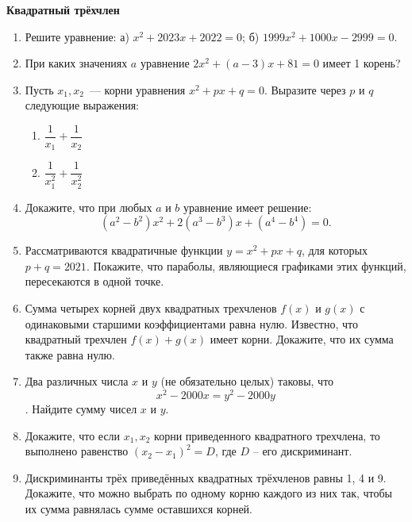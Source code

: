 \documentclass{article}
\begin{document}
\large
	

\begin{center}
\textbf{Квадратный трёхчлен}
\end{center}

\begin{enumerate}[label*=\protect\fbox{\arabic{enumi}}]

\item Решите уравнение: а) $x^2 + 2023x + 2022 = 0$; б) $1999x^2 + 1000x-2999=0$.

\item При каких значениях $a$ уравнение $2x^2 + (a - 3)x + 81 = 0$ имеет 1 корень?

\item Пусть $x_1, x_2$~--- корни уравнения  $x^2 + px + q = 0$.  Выразите через $p$ и $q$ следующие выражения: 
\begin{enumerate}
	
	\item $\dfrac{1}{x_1} + \dfrac{1}{x_2}$
	
	\item $\dfrac{1}{x_1^2} + \dfrac{1}{x_2^2}$
	
\end{enumerate}

\item Докажите, что при любых $a$ и $b$ уравнение имеет решение:
$$(a^2 - b^2)x^2 + 2(a^3 - b^3)x + (a^4 -b^4) =0.$$

\item Рассматриваются квадратичные функции  $y = x^2 + px + q$,  для которых  $p + q = 2021$.
Покажите, что параболы, являющиеся графиками этих функций, пересекаются в одной точке.

\item Сумма четырех корней двух квадратных трехчленов $f(x)$ и $g(x)$ с одинаковыми старшими коэффициентами равна нулю. Известно, что квадратный трехчлен $f(x)+g(x)$ имеет корни. Докажите, что их сумма также равна нулю.

\item Два различных числа $x$ и $y$ (не обязательно целых) таковы, что $$x^2 - 2000x = y^2 - 2000y$$.  Найдите сумму чисел $x$ и $y$.

\item Докажите, что если $x_1 , x_2$ корни приведенного квадратного трехчлена, то выполнено равенство $(x_2 - x_1)^2 = D$, где $D$ – его дискриминант.

\item Дискриминанты трёх приведённых квадратных трёхчленов равны 1, 4 и 9. Докажите, что можно выбрать по одному корню каждого из них так, чтобы их сумма равнялась сумме оставшихся корней.


\end{enumerate}
\end{document}
